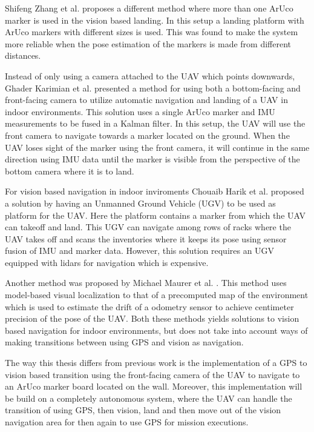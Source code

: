 \documentclass[../Head/report.tex]{subfiles}
\begin{document}
Shifeng Zhang et al. \cite{AnOnboardVisionBasedSystemNovelLandingPad} 	proposes a different method where more than one ArUco marker is used in the vision based landing. In this setup a landing platform with ArUco markers with different sizes is used. This was found to make the system more reliable when the pose estimation of the markers is made from different distances.   

Instead of only using a camera attached to the UAV which points downwards, Ghader Karimian et al. \cite{AutomaticnavigationandlandingofanindoorAR} presented a method for using both a bottom-facing and front-facing camera to utilize automatic navigation and landing of a UAV in indoor environments.  This solution uses a single ArUco marker and IMU measurements to be fused in a Kalman filter. In this setup, the UAV will use the front camera to navigate towards a marker located on the ground. When the UAV loses sight of the marker using the front camera, it will continue in the same direction using IMU data until the marker is visible from the perspective of the bottom camera where it is to land.

For vision based navigation in indoor inviroments Chouaib Harik et al. \cite{TowardsAnAutonomousVisionBasedInventoryDroneOne} proposed a solution by having an Unmanned Ground Vehicle (UGV) to be used as platform for the UAV. Here the platform contains a marker from which the UAV can takeoff and land. This UGV can navigate among rows of racks where the UAV takes off and scans the inventories where it keeps its pose using sensor fusion of IMU and marker data. However, this solution requires an UGV equipped with lidars for navigation which is expensive. 

Another method was proposed by Michael Maurer et al. \cite{TowardsAnAutonomousVisionBasedInventoryDroneTwo}. This method uses model-based visual localization to that of a precomputed
map of the environment which is used to estimate the drift of a odometry sensor to achieve centimeter precision of the pose of the UAV. Both these methods yields solutions to vision based navigation for indoor environments, but does not take into account ways of making transitions between using GPS and vision as navigation.

The way this thesis differs from previous work is the implementation of a GPS to vision based transition using the front-facing camera of the UAV to navigate to an ArUco marker board located on the wall. Moreover, this implementation will be build on a completely autonomous system, where the UAV can handle the transition of using GPS, then vision, land and then move out of the vision navigation area for then again to use GPS for mission executions.
  
\end{document}
